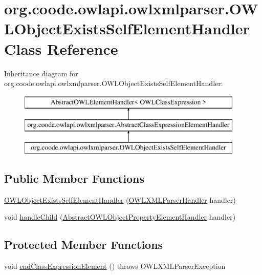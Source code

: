 \hypertarget{classorg_1_1coode_1_1owlapi_1_1owlxmlparser_1_1_o_w_l_object_exists_self_element_handler}{\section{org.\-coode.\-owlapi.\-owlxmlparser.\-O\-W\-L\-Object\-Exists\-Self\-Element\-Handler Class Reference}
\label{classorg_1_1coode_1_1owlapi_1_1owlxmlparser_1_1_o_w_l_object_exists_self_element_handler}
}
Inheritance diagram for org.\-coode.\-owlapi.\-owlxmlparser.\-O\-W\-L\-Object\-Exists\-Self\-Element\-Handler\-:\begin{figure}[H]
\begin{center}
\leavevmode
\includegraphics[height=3.000000cm]{classorg_1_1coode_1_1owlapi_1_1owlxmlparser_1_1_o_w_l_object_exists_self_element_handler}
\end{center}
\end{figure}
\subsection*{Public Member Functions}
\begin{DoxyCompactItemize}
\item 
\hyperlink{classorg_1_1coode_1_1owlapi_1_1owlxmlparser_1_1_o_w_l_object_exists_self_element_handler_aff8b6bcb81afc4ae68695949336ca575}{O\-W\-L\-Object\-Exists\-Self\-Element\-Handler} (\hyperlink{classorg_1_1coode_1_1owlapi_1_1owlxmlparser_1_1_o_w_l_x_m_l_parser_handler}{O\-W\-L\-X\-M\-L\-Parser\-Handler} handler)
\item 
void \hyperlink{classorg_1_1coode_1_1owlapi_1_1owlxmlparser_1_1_o_w_l_object_exists_self_element_handler_abff0839bca63f408df5fec2121ea1d57}{handle\-Child} (\hyperlink{classorg_1_1coode_1_1owlapi_1_1owlxmlparser_1_1_abstract_o_w_l_object_property_element_handler}{Abstract\-O\-W\-L\-Object\-Property\-Element\-Handler} handler)
\end{DoxyCompactItemize}
\subsection*{Protected Member Functions}
\begin{DoxyCompactItemize}
\item 
void \hyperlink{classorg_1_1coode_1_1owlapi_1_1owlxmlparser_1_1_o_w_l_object_exists_self_element_handler_ad8698ce5e2b945734714d4dbbfeecab7}{end\-Class\-Expression\-Element} ()  throws O\-W\-L\-X\-M\-L\-Parser\-Exception 
\end{DoxyCompactItemize}

